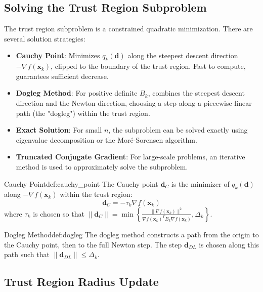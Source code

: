 \documentclass{MathNote}
\begin{document}
\subsection{Solving the Trust Region Subproblem}

The trust region subproblem is a constrained quadratic minimization. There are several solution strategies:

\begin{itemize}
    \item \textbf{Cauchy Point}: Minimizes $q_k(\bm{d})$ along the steepest descent direction $-\nabla f(\bm{x}_k)$, clipped to the boundary of the trust region. Fast to compute, guarantees sufficient decrease.
    \item \textbf{Dogleg Method}: For positive definite $B_k$, combines the steepest descent direction and the Newton direction, choosing a step along a piecewise linear path (the "dogleg") within the trust region.
    \item \textbf{Exact Solution}: For small $n$, the subproblem can be solved exactly using eigenvalue decomposition or the Moré-Sorensen algorithm.
    \item \textbf{Truncated Conjugate Gradient}: For large-scale problems, an iterative method is used to approximately solve the subproblem.
\end{itemize}

\begin{definition}{Cauchy Point}{def:cauchy_point}
    The Cauchy point $\bm{d}_C$ is the minimizer of $q_k(\bm{d})$ along $-\nabla f(\bm{x}_k)$ within the trust region:
    $$
    \bm{d}_C = -\tau_k \nabla f(\bm{x}_k)
    $$
    where $\displaystyle\tau_k$ is chosen so that $\displaystyle\|\bm{d}_C\| = \min\left\{ \frac{\|\nabla f(\bm{x}_k)\|^2}{\nabla f(\bm{x}_k)^T B_k \nabla f(\bm{x}_k)}, \Delta_k \right\}$.
\end{definition}

\begin{definition}{Dogleg Method}{def:dogleg}
    The dogleg method constructs a path from the origin to the Cauchy point, then to the full Newton step. The step $\bm{d}_{DL}$ is chosen along this path such that $\|\bm{d}_{DL}\| \le \Delta_k$.
\end{definition}

\subsection{Trust Region Radius Update}
\end{document}
